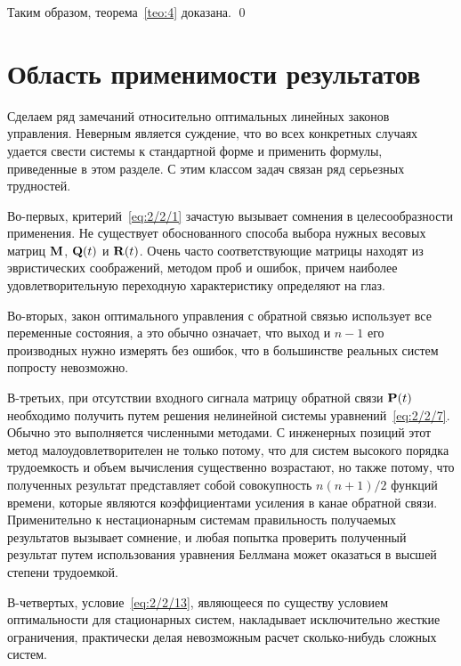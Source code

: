 Таким образом, теорема~\vref{teo:4} доказана. \qed



\section{Область применимости результатов}



Сделаем ряд замечаний относительно оптимальных линейных законов управления. Неверным является суждение, что во всех конкретных случаях удается свести системы к стандартной форме и применить формулы, приведенные в этом разделе. С этим классом задач связан ряд серьезных трудностей.

Во-первых, критерий~\vref{eq:2/2/1} зачастую вызывает сомнения в целесообразности применения. Не существует обоснованного способа выбора нужных весовых матриц $\mathbf{M}$, $\mathbf{Q}(t)$ и $\mathbf{R}(t)$. Очень часто соответствующие матрицы находят из эвристических соображений, методом проб и ошибок, причем наиболее удовлетворительную переходную характеристику определяют на глаз.

Во-вторых, закон оптимального управления с обратной связью использует все переменные состояния, а это обычно означает, что выход и $n-1$ его производных нужно измерять без ошибок, что в большинстве реальных систем попросту невозможно.

В-третьих, при отсутствии входного сигнала матрицу обратной связи $\mathbf{P}(t)$ необходимо получить путем решения нелинейной системы уравнений~\vref{eq:2/2/7}. Обычно это выполняется численными методами. С инженерных позиций этот метод малоудовлетворителен не только потому, что для систем высокого порядка трудоемкость и объем вычисления существенно возрастают, но также потому, что полученных результат представляет собой совокупность $n(n+1)/2$ функций времени, которые являются коэффициентами усиления в канае обратной связи. Применительно к нестационарным системам правильность получаемых результатов вызывает сомнение, и любая попытка проверить полученный результат путем использования уравнения Беллмана может оказаться в высшей степени трудоемкой.

В-четвертых, условие~\vref{eq:2/2/13}, являющееся по существу условием оптимальности для стационарных систем, накладывает исключительно жесткие ограничения, практически делая невозможным расчет сколько-нибудь сложных систем.
